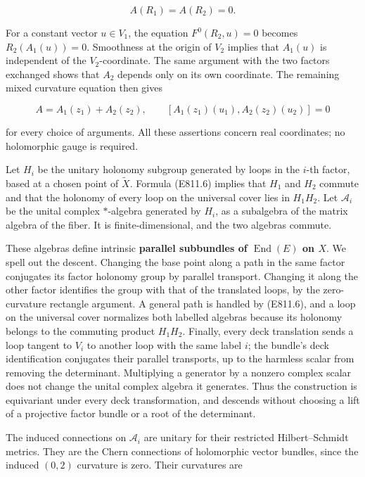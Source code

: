 \[
 A(R_1)=A(R_2)=0.
\]

For a constant vector \(u\in V_1\), the equation \(F^0(R_2,u)=0\)
becomes \(R_2(A_1(u))=0\). Smoothness at the origin of \(V_2\) implies
that \(A_1(u)\) is independent of the \(V_2\)-coordinate. The same
argument with the two factors exchanged shows that \(A_2\) depends only
on its own coordinate. The remaining mixed curvature equation then gives

\[
 A=A_1(z_1)+A_2(z_2),\qquad
 [A_1(z_1)(u_1),A_2(z_2)(u_2)]=0
 \tag{E811.6}
\]

for every choice of arguments. All these assertions concern real
coordinates; no holomorphic gauge is required.

Let \(H_i\) be the unitary holonomy subgroup generated by loops in the
\(i\)-th factor, based at a chosen point of \(\widetilde X\). Formula
(E811.6) implies that \(H_1\) and \(H_2\) commute and that the holonomy
of every loop on the universal cover lies in \(H_1H_2\). Let
\(\mathscr A_i\) be the unital complex \(*\)-algebra generated by
\(H_i\), as a subalgebra of the matrix algebra of the fiber. It is
finite-dimensional, and the two algebras commute.

These algebras define intrinsic \textbf{parallel subbundles of
\(\operatorname{End}(E)\) on \(X\)}. We spell out the descent. Changing
the base point along a path in the same factor conjugates its factor
holonomy group by parallel transport. Changing it along the other factor
identifies the group with that of the translated loops, by the
zero-curvature rectangle argument. A general path is handled by
(E811.6), and a loop on the universal cover normalizes both labelled
algebras because its holonomy belongs to the commuting product
\(H_1H_2\). Finally, every deck translation sends a loop tangent to
\(V_i\) to another loop with the same label \(i\); the bundle's deck
identification conjugates their parallel transports, up to the harmless
scalar from removing the determinant. Multiplying a generator by a
nonzero complex scalar does not change the unital complex algebra it
generates. Thus the construction is equivariant under every deck
transformation, and descends without choosing a lift of a projective
factor bundle or a root of the determinant.

The induced connections on \(\mathscr A_i\) are unitary for their
restricted Hilbert--Schmidt metrics. They are the Chern connections of
holomorphic vector bundles, since the induced \((0,2)\) curvature is
zero. Their curvatures are

